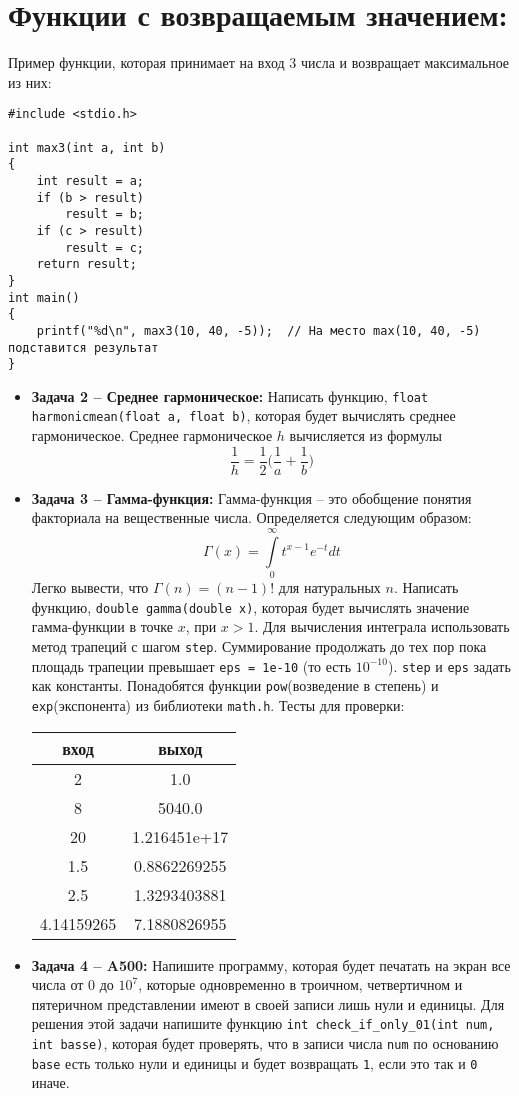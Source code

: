 \documentclass{article}
\begin{document}
\section*{Функции с возвращаемым значением:}
Пример функции, которая принимает на вход 3 числа и возвращает максимальное из них:
\begin{lstlisting}
#include <stdio.h>

int max3(int a, int b)
{
	int result = a;
	if (b > result)
		result = b;
	if (c > result)
		result = c;
	return result;
}
int main()
{
	printf("%d\n", max3(10, 40, -5));  // На место max(10, 40, -5) подставится результат
}
\end{lstlisting}
\begin{itemize}
\item \textbf{Задача 2 -- Среднее гармоническое:}  Написать функцию, \texttt{float harmonicmean(float a, float b)}, которая будет вычислять среднее гармоническое. Среднее гармоническое $h$ вычисляется из формулы 
$$\frac{1}{h} = \frac{1}{2}\Big(\frac{1}{a} + \frac{1}{b}\Big)$$

\item \textbf{Задача 3 -- Гамма-функция:} Гамма-функция -- это обобщение понятия факториала на вещественные числа. Определяется следующим образом:
$$
\Gamma \left( x \right) = \int\limits_0^\infty {t^{x - 1} e^{ - t} dt}
$$
Легко вывести, что $\Gamma(n) = (n - 1)!$ для натуральных $n$. Написать функцию, \texttt{double gamma(double x)}, которая будет вычислять значение гамма-функции в точке $x$, при $x > 1$. Для вычисления интеграла использовать метод трапеций с шагом \texttt{step}. Суммирование продолжать до тех пор пока площадь трапеции превышает \texttt{eps = 1e-10} (то есть $10 ^{-10}$). \texttt{step} и \texttt{eps} задать как константы. Понадобятся функции \texttt{pow}(возведение в степень) и \texttt{exp}(экспонента) из библиотеки \texttt{math.h}. Тесты для проверки:

\begin{center}
\begin{tabular}{ c c }
 вход & выход \\ \hline
 2 & 1.0  \\ 
 8 & 5040.0  \\
 20 & 1.216451e+17  \\
 1.5 &        0.8862269255 \\
 2.5 &        1.3293403881\\
 4.14159265 & 7.1880826955\\
\end{tabular}
\end{center}

\item \textbf{Задача 4 -- A500:} Напишите программу, которая будет печатать на экран все числа от $0$ до $10^{7}$, которые одновременно в троичном, четвертичном и пятеричном представлении имеют в своей записи лишь нули и единицы. Для решения этой задачи напишите функцию \texttt{int check\_if\_only\_01(int num, int basse)}, которая будет проверять, что в записи числа \texttt{num} по основанию \texttt{base} есть только нули и единицы и будет возвращать \texttt{1}, если это так и \texttt{0} иначе.
\end{itemize}
\end{document}
